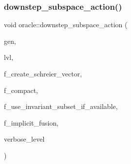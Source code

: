 \mbox{\label{classoracle_a26f568b84b1ca2c24f619278ac88c407}} 
\subsubsection{\texorpdfstring{downstep\+\_\+subspace\+\_\+action()}{downstep\_subspace\_action()}}
{\footnotesize\ttfamily void oracle\+::downstep\+\_\+subspace\+\_\+action (\begin{DoxyParamCaption}\item[{\mbox{\hyperlink{classgenerator}{generator}} $\ast$}]{gen,  }\item[{\mbox{\hyperlink{galois_8h_a09fddde158a3a20bd2dcadb609de11dc}{I\+NT}}}]{lvl,  }\item[{\mbox{\hyperlink{galois_8h_a09fddde158a3a20bd2dcadb609de11dc}{I\+NT}}}]{f\+\_\+create\+\_\+schreier\+\_\+vector,  }\item[{\mbox{\hyperlink{galois_8h_a09fddde158a3a20bd2dcadb609de11dc}{I\+NT}}}]{f\+\_\+compact,  }\item[{\mbox{\hyperlink{galois_8h_a09fddde158a3a20bd2dcadb609de11dc}{I\+NT}}}]{f\+\_\+use\+\_\+invariant\+\_\+subset\+\_\+if\+\_\+available,  }\item[{\mbox{\hyperlink{galois_8h_a09fddde158a3a20bd2dcadb609de11dc}{I\+NT}}}]{f\+\_\+implicit\+\_\+fusion,  }\item[{\mbox{\hyperlink{galois_8h_a09fddde158a3a20bd2dcadb609de11dc}{I\+NT}}}]{verbose\+\_\+level }\end{DoxyParamCaption})}

\mbox{\label{classoracle_aa23545cebae0fe4f46a689641c775c92}} 
